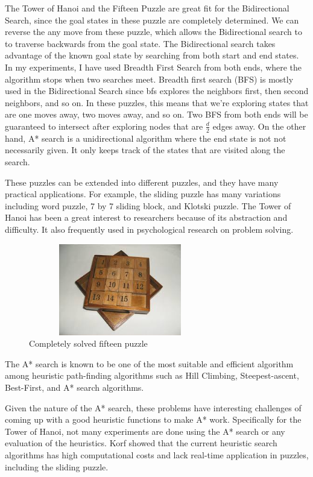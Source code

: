 \documentclass[conference]{IEEEtran}
\begin{document}
The Tower of Hanoi and the Fifteen Puzzle are great fit for the Bidirectional Search, since the goal states in these puzzle are completely determined. We can reverse the any move from these puzzle, which allows the Bidirectional search to to traverse backwards from the goal state. The Bidirectional search takes advantage of the known goal state by searching from both start and end states. In my experiments, I have used Breadth First Search from both ends, where the algorithm stops when two searches meet. Breadth first search (BFS) is mostly used in the Bidirectional Search since bfs explores the neighbors first, then second neighbors, and so on. In these puzzles, this means that we're exploring states that are one moves away, two moves away, and so on. Two BFS from both ends will be guaranteed to intersect after exploring nodes that are $\frac{d}{2}$ edges away. On the other hand, A* search is a unidirectional algorithm where the end state is not not necessarily given. It only keeps track of the states that are visited along the search.

These puzzles can be extended into different puzzles, and they have many practical applications. For example, the sliding puzzle has many variations including word puzzle, 7 by 7 sliding block, and Klotski puzzle. The Tower of Hanoi has been a great interest to researchers because of its abstraction and difficulty. It also frequently used in psychological research on problem solving.

\begin{figure}[!t]
\includegraphics[width=8cm, height=4cm]{slidingpuzzle}
\centering
\caption{Completely solved fifteen puzzle}
\end{figure}

The A* search is known to be one of the most suitable and efficient algorithm among heuristic path-finding algorithms such as Hill Climbing, Steepest-ascent, Best-First, and A* search algorithms. \cite{Potdar}

Given the nature of the A* search, these problems have interesting challenges of coming up with a good heuristic functions to make A* work. Specifically for the Tower of Hanoi, not many experiments are done using the A* search or any evaluation of the heuristics. Korf showed that the current heuristic search algorithms has high computational costs and lack real-time application in puzzles, including the sliding puzzle. \cite{Korf}
\end{document}

